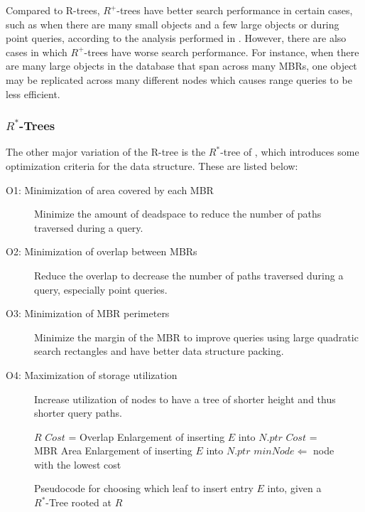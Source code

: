 Compared to R-trees, $R^{+}$-trees have better search performance in certain cases,
such as when there are many small objects and a few large objects or during point 
queries, according to the analysis performed in \cite{sellisroussopoulosfaloutsos87}. 
However, there are also cases in which $R^{+}$-trees have worse search performance. 
For instance, when there are many large objects in the database that span across many
MBRs, one object may be replicated across many different nodes which causes range
queries to be less efficient.





\subsubsection{$R^{*}$-Trees}
The other major variation of the R-tree is the $R^{*}$-tree of \cite{Beckmann:1990:RER:93597.98741}, which introduces 
some optimization criteria for the data structure. These are listed below:

\begin{description}
	\item[O1: Minimization of area covered by each MBR] Minimize the amount of 
		deadspace to reduce the number of paths traversed during a query.
	\item[O2: Minimization of overlap between MBRs] Reduce the overlap to decrease the
		number of paths traversed during a query, especially point queries.
	\item[O3: Minimization of MBR perimeters] Minimize the margin of the MBR to 
		improve queries using large quadratic search rectangles and have better 
		data structure packing.
	\item[O4: Maximization of storage utilization] Increase utilization of nodes to 
		have a tree of shorter height and thus shorter query paths.
\end{description}

\begin{figure}[ht!]
	\begin{algorithmic}
				\Return $R$
			\Else
						\State $Cost$ = Overlap Enlargement of inserting $E$ into $N.ptr$
					\Else
						\State $Cost$ = MBR Area Enlargement of inserting $E$ into $N.ptr$
					\EndIf
				\EndFor
				\State $minNode \Leftarrow$ node with the lowest cost
			\EndIf
		\EndFunction
	\end{algorithmic}
	\caption{Pseudocode for choosing which leaf to insert entry $E$ into, given a 
	$R^{*}$-Tree rooted at $R$}
	\label{fig:R*-Tree_ChooseLeaf}
\end{figure}


